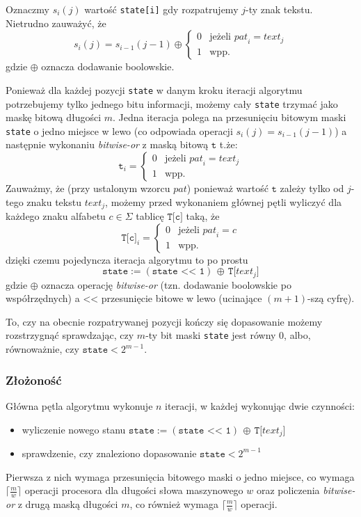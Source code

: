 \documentclass{article}
\begin{document}
Oznaczmy $s_i(j)$ wartość \texttt{state[i]} gdy rozpatrujemy $j$-ty znak tekstu. Nietrudno zauważyć, że
$$
s_i(j) = s_{i-1}(j-1) \oplus \begin{cases}
0&\text{jeżeli } \textit{pat}_i = \textit{text}_j\\
1&\text {wpp.}
\end{cases} 
$$
gdzie $\oplus$ oznacza dodawanie boolowskie.

Ponieważ dla każdej pozycji \texttt{state} w danym kroku iteracji algorytmu potrzebujemy tylko jednego bitu informacji, możemy cały \texttt{state} trzymać jako maskę bitową długości $m$. Jedna iteracja polega na przesunięciu bitowym maski \texttt{state} o jedno miejsce w lewo (co odpowiada operacji $s_i(j)=s_{i-1}(j-1)$) a następnie wykonaniu \textit{bitwise-or} z maską bitową $\texttt t$ t.że:
$$
\texttt{t}_i = \begin{cases}
0&\text{jeżeli } \textit{pat}_i = \textit{text}_j\\
1&\text {wpp.}
\end{cases}
$$
Zauważmy, że (przy ustalonym wzorcu $\textit{pat}$) ponieważ wartość $\texttt t$ zależy tylko od $j$-tego znaku tekstu $\textit{text}_j$, możemy przed wykonaniem głównej pętli wyliczyć dla każdego znaku alfabetu $c\in\Sigma$ tablicę $\texttt{T[c]}$ taką, że
$$
\texttt{T[c]}_i = \begin{cases}
0&\text{jeżeli } \textit{pat}_i = c\\
1&\text {wpp.}
\end{cases}
$$
dzięki czemu pojedyncza iteracja algorytmu to po prostu
$$
\texttt{state} := (\texttt{state << 1})\,\oplus\,\texttt{T[}\textit{text}_j\texttt{]}
$$
gdzie $\oplus$ oznacza operację \textit{bitwise-or} (tzn. dodawanie boolowskie po współrzędnych) a $\texttt{<<}$ przesunięcie bitowe w lewo (ucinające $(m+1)$-szą cyfrę). 

To, czy na obecnie rozpatrywanej pozycji kończy się dopasowanie możemy rozstrzygnąć sprawdzając, czy $m$-ty bit maski \texttt{state} jest równy 0, albo, równoważnie, czy $\texttt{state} < 2^{m-1}$.

\subsubsection*{Złożoność}
Główna pętla algorytmu wykonuje $n$ iteracji, w każdej wykonując dwie czynności:
\begin{itemize}
    \item wyliczenie nowego stanu $\texttt{state} := (\texttt{state << 1})\,\oplus\,\texttt{T[}\textit{text}_j\texttt{]}$
    \item sprawdzenie, czy znaleziono dopasowanie $\texttt{state} < 2^{m-1}$
\end{itemize}
Pierwsza z nich wymaga przesunięcia bitowego maski o jedno miejsce, co wymaga $\lceil \frac{m}{w} \rceil$ operacji procesora dla długości słowa maszynowego $w$ oraz policzenia \textit{bitwise-or} z drugą maską długości $m$, co również wymaga $\lceil \frac{m}{w} \rceil$ operacji.
\end{document}
